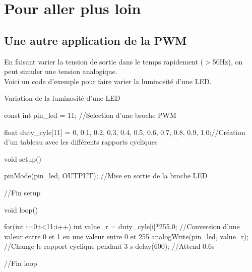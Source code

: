 \section{Pour aller plus loin}

\subsection{Une autre application de la PWM}

En faisant varier la tension de sortie dans le temps rapidement ($>$50Hz), on peut simuler une 
tension analogique.\\

Voici un code d'exemple pour faire varier la luminosité d'une LED.

\begin{Cpp}{Variation de la luminosité d'une LED}

  const int pin_led = 11; //Selection d'une broche PWM

  float duty_cyle[11] = {0, 0.1, 0.2, 0.3, 0.4, 0.5, 0.6, 0.7, 0.8, 0.9, 1.0};//Création d'un tableau avec les différents 
  rapports cycliques
  
  void setup() {
  
      pinMode(pin_led, OUTPUT);  //Mise en sortie de la broche LED
  
  }//Fin setup
  
  void loop() {
  
      for(int i=0;i<11;i++) 
      {
          int value_r = duty_cyle[i]*255.0; //Conversion d'une valeur entre 0 et 1 en une valeur entre 0 et 255
          analogWrite(pin_led, value_r); //Change le rapport cyclique pendant 3 s
          delay(600);        //Attend 0.6s
      }
      
  
  }//Fin loop

\end{Cpp}


